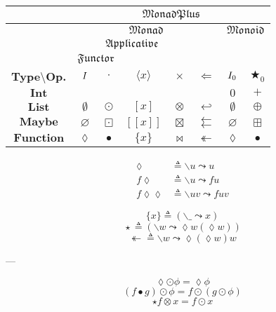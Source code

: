\documentclass{jsarticle}
\def\[{[\![}
\def\]{]\!]}
\newcommand{\typeclassname}[1]{\mathfrak{#1}}
\newcommand{\typeclassapplicative}{\typeclassname{Applicative}}
\newcommand{\typeclassfunctor}{\typeclassname{Functor}}
\newcommand{\typeclassmonad}{\typeclassname{Monad}}
\newcommand{\typeclassmonadplus}{\typeclassname{MonadPlus}}
\newcommand{\typeclassmonoid}{\typeclassname{Monoid}}
\newcommand{\typename}[1]{\mathbf{#1}}
\newcommand{\typefunction}{\typename{Function}}
\newcommand{\typeint}{\typename{Int}}
\newcommand{\typelist}{\typename{List}}
\newcommand{\typemaybe}{\typename{Maybe}}
\newcommand{\constantempty}{\emptyset}
\newcommand{\constantnothing}{\varnothing}
\newcommand{\anonymousparameter}{\lozenge}
\newcommand{\identity}{\mathnormal{I}}
\newcommand{\identityfunction}{\anonymousparameter}
\newcommand{\binaryadd}{+}
\newcommand{\binaryany}{\bigstar}
\newcommand{\binarycomposition}{\bullet}
\newcommand{\binaryfunctormap}{\cdot}
\newcommand{\binaryapplicativemap}{\times}
\newcommand{\binarymonadmap}{\Leftarrow}
\newcommand{\binarylistfunctormap}{\odot}
\newcommand{\binarylistapplicativemap}{\otimes}
\newcommand{\binarylistmonadmap}{\hookleftarrow}
\newcommand{\binarylistappend}{\oplus}
\newcommand{\binarymaybefunctormap}{\boxdot}
\newcommand{\binarymaybeapplicativemap}{\boxtimes}
\newcommand{\binarymaybemonadmap}{\leftleftarrows}
\newcommand{\binarymaybeappend}{\boxplus}
\newcommand{\binaryfunctionfunctormap}{\binarycomposition}
\newcommand{\binaryfunctionapplicativemap}{\bowtie}
\newcommand{\binaryfunctionmonadmap}{\twoheadleftarrow}
\newcommand{\applicativetype}[1]{\langle#1\rangle}
\newcommand{\listtype}[1]{[#1]}
\newcommand{\maybetype}[1]{\[#1\]}
\newcommand{\functyontype}[1]{\{#1\}}
\newcommand{\identity}{I}
\newcommand{\listtype}[1]{[#1]}
\newcommand{\maybetype}[1]{\[#1\]}
\newcommand{\functype}[1]{\{#1\}}
\newcommand{\hrightarrow}{\leadsto}
\newcommand{\hlambdaparameter}{\lozenge}
\newcommand{\hlambda}{\backslash}
\newcommand{\hlambdaparameterignore}{\_}
\newcommand{\hpurefunc}[1]{\functype{#1}}
\newcommand{\hpurefuncimp}[1]{(\hlambda\hlambdaparameterignore\hrightarrow#1)}
\newcommand{\hfuncafmap}{\star}
\newcommand{\hfuncafmapimp}[1]{(\hlambda#1\hrightarrow\hlambdaparameter#1(\hlambdaparameter#1))}
\newcommand{\hmfbind}{\twoheadleftarrow}
\newcommand{\hmfbindimp}[1]{\hlambda#1\hrightarrow\hlambdaparameter(\hlambdaparameter#1)#1}
\begin{document}
\begin{center}
\begin{tabular}{||c||c|c|c|c|c|c|c||}
\hline
{ }
    &\multicolumn{7}{|c||}{$\typeclassmonadplus$}\\
\hline
{ }
    &\multicolumn{5}{|c|}{$\typeclassmonad$}
    &\multicolumn{2}{|c||}{$\typeclassmonoid$}\\
\hline
{ }
    &\multicolumn{4}{|c|}{$\typeclassapplicative$}
    &
    &\multicolumn{2}{|c||}{ }\\
\hline
{ }
    &\multicolumn{2}{|c|}{$\typeclassfunctor$}
    &\multicolumn{2}{|c|}{ }
    &
    &\multicolumn{2}{|c||}{ }\\
\hline
\textbf{Type$\setminus$Op.}
    &$\identity$
    &$\binaryfunctormap$
    &$\applicativetype{x}$
    &$\binaryapplicativemap$
    &$\binarymonadmap$
    &$\identity_0$
    &$\binaryany_0$\\
\hline\hline
$\typeint$
    &
    &
    &
    &
    &
    &$0$
    &$\binaryadd$\\
\hline
$\typelist$
    &$\constantempty$
    &$\binarylistfunctormap$
    &$\listtype{x}$
    &$\binarylistapplicativemap$
    &$\binarylistmonadmap$
    &$\constantempty$
    &$\binarylistappend$\\
\hline
$\typemaybe$
    &$\constantnothing$
    &$\binarymaybefunctormap$
    &$\maybetype{x}$
    &$\binarymaybeapplicativemap$
    &$\binarymaybemonadmap$
    &$\constantnothing$
    &$\binarymaybeappend$\\
\hline
$\typefunction$
    &$\identityfunction$
    &$\binaryfunctionfunctormap$
    &$\functyontype{x}$
    &$\binaryfunctionapplicativemap$
    &$\binaryfunctionmonadmap$
    &$\identityfunction$
    &$\binarycomposition$\\
\hline
\end{tabular}
\end{center}

\begin{align*}
\hlambdaparameter&\triangleq\hlambda u\hrightarrow u\\
f\hlambdaparameter&\triangleq\hlambda u\hrightarrow fu\\
f\hlambdaparameter\hlambdaparameter&\triangleq\hlambda uv\hrightarrow fuv
\end{align*}


$$\hpurefunc{x}\triangleq\hpurefuncimp{x}$$
$${}\hfuncafmap{}\triangleq\hfuncafmapimp{w}$$
$${}\hmfbind{}\triangleq\hmfbindimp{w}$$

---

$$\lozenge\odot\phi=\lozenge\phi$$
$$(f\bullet g)\odot\phi=f\odot(g\odot\phi)$$
$$\star f\otimes x=f\odot x$$
\end{document}
